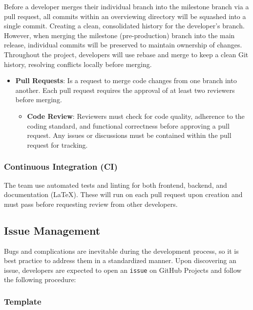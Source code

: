 \documentclass{article}
\begin{document}
Before a developer merges their individual branch into the milestone branch via
a pull request, all commits within an overviewing directory will be squashed
into a single commit. Creating a clean, consolidated history for the developer’s
branch. However, when merging the milestone (pre-production) branch into the
main release, individual commits will be preserved to maintain ownership of
changes. Throughout the project, developers will use rebase and merge to keep a
clean Git history, resolving conflicts locally before merging.

\begin{itemize}
    \item \textbf{Pull Requests}:  Is a request to merge code changes from
    one branch into another. Each pull request requires the approval of at least two
    reviewers before merging.
    \begin{itemize}
        \item \textbf{Code Review}: Reviewers must check for code quality,
        adherence to the coding standard, and functional correctness before
        approving a pull request. Any issues or discussions must be contained
        within the pull request for tracking.
    \end{itemize}
\end{itemize}

\subsubsection{Continuous Integration (CI)}

The team use automated tests and linting for both frontend, backend, and
documentation (LaTeX). These will run on each pull request upon creation and must pass
before requesting review from other developers.

\subsection{Issue Management}

Bugs and complications are inevitable during the development process, so it is
best practice to address them in a standardized manner. Upon discovering an
issue, developers are expected to open an \texttt{issue} on GitHub Projects and
follow the following procedure:

\subsubsection{Template}
\end{document}

